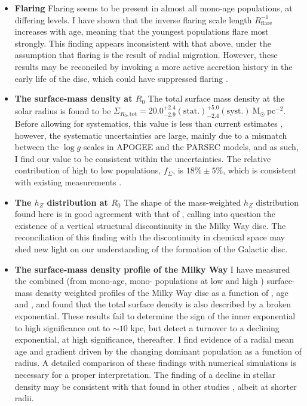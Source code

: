 \begin{itemize}
\item \textbf{Flaring} Flaring seems to be present in almost all mono-age populations, at differing levels. I have shown that the inverse flaring scale length $R_{\mathrm{flare}}^{-1}$ increases with age, meaning that the youngest populations flare most strongly. This finding appears inconsistent with that above, under the assumption that flaring is the result of radial migration. However, these results may be reconciled by invoking a more active accretion history in the early life of the disc, which could have suppressed flaring \citep[e.g.][]{2014ApJ...781L..20M}.
\item \textbf{The surface-mass density at $R_0$} The total surface mass density at the solar radius is found to be  $\Sigma_{R_0, \text{tot}} = 20.0_{-2.9}^{+2.4}\mathrm{(stat.)}_{-2.4}^{+5.0}\mathrm{(syst.)}\ \mathrm{M_{\odot} \ pc^{-2}}$. Before allowing for systematics, this value is less than current estimates \citep[e.g.][]{2012ApJ...751..131B,2006MNRAS.372.1149F,2015ApJ...814...13M}, however, the systematic uncertainties are large, mainly due to a mismatch between the $\log{g}$ scales in APOGEE and the PARSEC models, and as such, I find our value to be consistent within the uncertainties. The relative contribution of high to low \afe{} populations, $f_\Sigma$, is $18\% \pm 5\%$, which is consistent with existing measurements \citep[e.g.][]{2016ARA&A..54..529B}. 
\item \textbf{The $h_Z$ distribution at $R_0$} The shape of the mass-weighted $h_Z$ distribution found here is in good agreement with that of \citet{2012ApJ...751..131B}, calling into question the existence of a vertical structural discontinuity in the Milky Way disc. The reconciliation of this finding with the discontinuity in chemical space \citep[e.g. the bimodality in \afe{} at fixed \feh{}:][]{2015ApJ...808..132H,2014ApJ...796...38N} may shed new light on our understanding of the formation of the Galactic disc.
\item \textbf{The surface-mass density profile of the Milky Way} I have measured the combined (from mono-age, mono-\feh{} populations at low and high \afe{}) surface-mass density weighted profiles of the Milky Way disc as a function of \afe{}, age and \feh{}, and found that the total surface density is also described by a broken exponential. These results fail to determine the sign of the inner exponential to high significance out to $\sim 10$ kpc, but detect a turnover to a declining exponential, at high significance, thereafter. I find evidence of a radial mean age and \feh{} gradient driven by the changing dominant population as a function of radius. A detailed comparison of these findings with numerical simulations is necessary for a proper interpretation. The finding of a decline in stellar density may be consistent with that found in other studies \citep[e.g.][]{2009A&A...495..819R,2010MNRAS.402..713S}, albeit at shorter radii.
\end{itemize}

